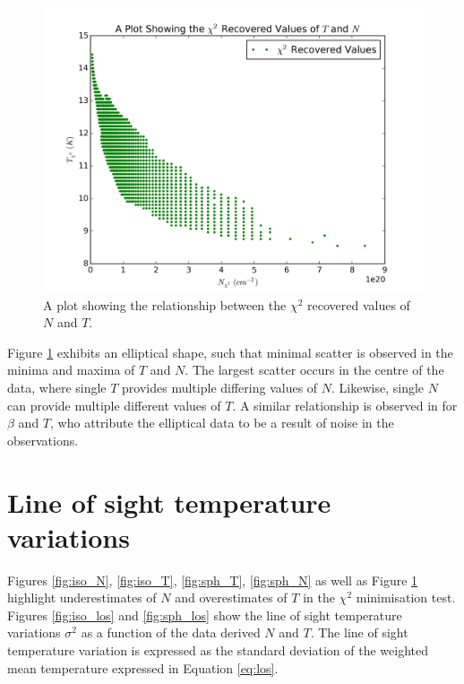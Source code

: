 \documentclass{report}
\begin{document}
\begin{figure}[H]
  \centering
  \includegraphics[width=0.5\linewidth]{../img/sph/contours.png}
  \caption{A plot showing the relationship between the $\chi^{2}$ recovered values of $N$ and $T$.}\label{fig:contours}
\end{figure}

Figure \ref{fig:contours} exhibits an elliptical shape, such that minimal scatter is observed in the minima and maxima of $T$ and $N$. The largest scatter occurs in the centre of the data, where single $T$ provides multiple differing values of $N$. Likewise, single $N$ can provide multiple different values of $T$. A similar relationship is observed in \textcite{noise,noiseb} for $\beta$ and $T$, who attribute the elliptical data to be a result of noise in the observations.

\section{Line of sight temperature variations}
Figures \ref{fig:iso_N}, \ref{fig:iso_T},  \ref{fig:sph_T}, \ref{fig:sph_N} as well as Figure \ref{fig:contours} highlight underestimates of $N$ and overestimates of $T$ in the $\chi^{2}$ minimisation test.
Figures \ref{fig:iso_los} and \ref{fig:sph_los} show the line of sight temperature variations $\sigma^{2}$ as a function of the data derived $N$ and $T$. The line of sight temperature variation is expressed as the standard deviation of the weighted mean temperature expressed in Equation \ref{eq:los}.
\end{document}
